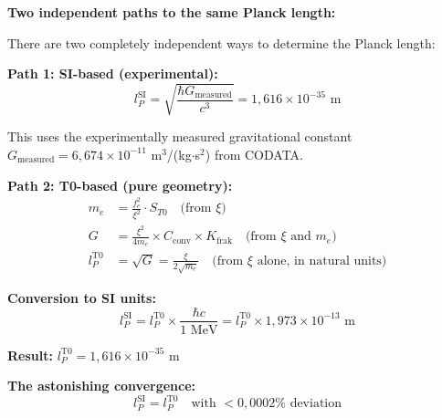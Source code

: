 	\begin{historical}
		\textbf{Two independent paths to the same Planck length:}
		
		There are two completely independent ways to determine the Planck length:
		
		\textbf{Path 1: SI-based (experimental):}
		\begin{equation}
			l_P^{\text{SI}} = \sqrt{\frac{\hbar G_{\text{measured}}}{c^3}} = 1{,}616 \times 10^{-35} \text{ m}
		\end{equation}
		
		This uses the experimentally measured gravitational constant $G_{\text{measured}} = 6{,}674 \times 10^{-11}$ m$^3$/(kg$\cdot$s$^2$) from CODATA.
		
		\textbf{Path 2: T0-based (pure geometry):}
		\begin{align}
			m_e &= \frac{f_e^2}{\xi^2} \cdot S_{T0} \quad \text{(from } \xi\text{)} \\
			G &= \frac{\xi^2}{4m_e} \times C_{\text{conv}} \times K_{\text{frak}} \quad \text{(from } \xi \text{ and } m_e\text{)} \\
			l_P^{\text{T0}} &= \sqrt{G} = \frac{\xi}{2\sqrt{m_e}} \quad \text{(from } \xi \text{ alone, in natural units)}
		\end{align}
		
		\textbf{Conversion to SI units:}
		\begin{equation}
			l_P^{\text{SI}} = l_P^{\text{T0}} \times \frac{\hbar c}{1 \text{ MeV}} = l_P^{\text{T0}} \times 1{,}973 \times 10^{-13} \text{ m}
		\end{equation}
		
		\textbf{Result:} $l_P^{\text{T0}} = 1{,}616 \times 10^{-35}$ m
		
		\textbf{The astonishing convergence:}
		\begin{equation}
			\boxed{l_P^{\text{SI}} = l_P^{\text{T0}} \quad \text{with } <0{,}0002\% \text{ deviation}}
		\end{equation}
	\end{historical}
	

